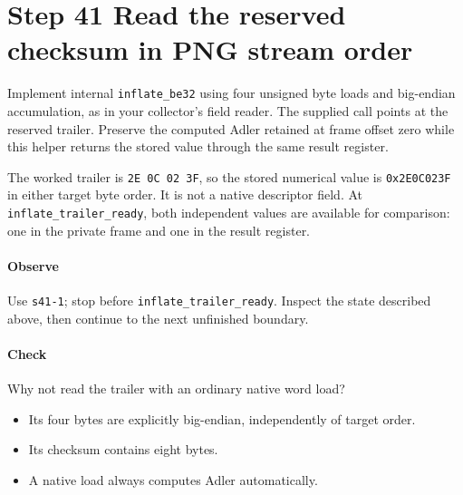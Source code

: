 \section{Step 41 Read the reserved checksum in PNG stream order}\label{png-inflate-s41}
Implement internal \texttt{inflate\_be32} using four unsigned byte loads and big-endian accumulation, as in your collector's field reader. The supplied call points at the reserved trailer. Preserve the computed Adler retained at frame offset zero while this helper returns the stored value through the same result register.

The worked trailer is \texttt{2E 0C 02 3F}, so the stored numerical value is \texttt{0x2E0C023F} in either target byte order. It is not a native descriptor field. At \texttt{inflate\_trailer\_ready}, both independent values are available for comparison: one in the private frame and one in the result register.

\paragraph{Observe} Use \texttt{s41-1}; stop before \texttt{inflate\_trailer\_ready}. Inspect the state described above, then continue to the next unfinished boundary.

\paragraph{Check} Why not read the trailer with an ordinary native word load?
\begin{itemize}
\item[A.] Its four bytes are explicitly big-endian, independently of target order.
\item[B.] Its checksum contains eight bytes.
\item[C.] A native load always computes Adler automatically.
\end{itemize}
